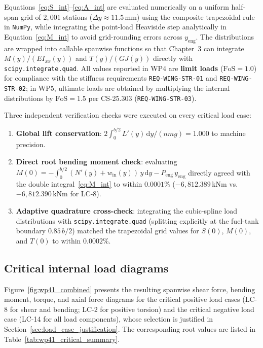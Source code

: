 Equations~\eqref{eq:S_int}--\eqref{eq:A_int} are evaluated numerically on a uniform half-span grid of $2{,}001$ stations ($\Delta y \approx 11.5\,\text{mm}$) using the composite trapezoidal rule in \texttt{NumPy}, while integrating the point-load Heaviside step analytically in Equation~\eqref{eq:M_int} to avoid grid-rounding errors across $y_{\mathrm{eng}}$. The distributions are wrapped into callable spanwise functions so that Chapter~3 can integrate $M(y)/(E I_{xx}(y))$ and $T(y)/(G J(y))$ directly with \texttt{scipy.integrate.quad}. All values reported in WP4 are \textbf{limit loads} ($\mathrm{FoS} = 1.0$) for compliance with the stiffness requirements \texttt{REQ-WING-STR-01} and \texttt{REQ-WING-STR-02}; in WP5, ultimate loads are obtained by multiplying the internal distributions by $\mathrm{FoS} = 1.5$ per CS-25.303 (\texttt{REQ-WING-STR-03}).

Three independent verification checks were executed on every critical load case:
\begin{enumerate}
    \item \textbf{Global lift conservation}: $2\int_0^{b/2} L'(y)\,\mathrm{d}y / (n m g) = 1.000$ to machine precision.
    \item \textbf{Direct root bending moment check}: evaluating $M(0) = -\int_0^{b/2} (N'(y) + w_{\mathrm{in}}(y))\,y\,\mathrm{d}y - P_{\mathrm{eng}}\,y_{\mathrm{eng}}$ directly agreed with the double integral~\eqref{eq:M_int} to within $0.0001\%$ ($-6{,}812.389\,\text{kNm}$ vs.\ $-6{,}812.390\,\text{kNm}$ for LC-8).
    \item \textbf{Adaptive quadrature cross-check}: integrating the cubic-spline load distributions with \texttt{scipy.integrate.quad} (splitting explicitly at the fuel-tank boundary $0.85\,b/2$) matched the trapezoidal grid values for $S(0)$, $M(0)$, and $T(0)$ to within $0.0002\%$.
\end{enumerate}

\subsection{Critical internal load diagrams}
\label{subsec:critical_diagrams}

Figure~\ref{fig:wp41_combined} presents the resulting spanwise shear force, bending moment, torque, and axial force diagrams for the critical positive load cases (LC-8 for shear and bending; LC-2 for positive torsion) and the critical negative load case (LC-14 for all load components), whose selection is justified in Section~\ref{sec:load_case_justification}. The corresponding root values are listed in Table~\ref{tab:wp41_critical_summary}.

